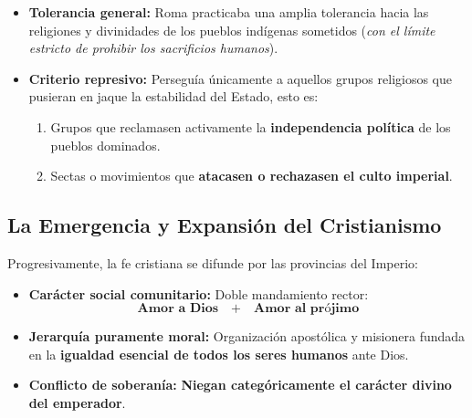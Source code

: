 \documentclass[11pt,letterpaper]{article}
\begin{document}
\begin{notabox}[title={Política Romana ante los Cultos Exteriores}]
  \begin{itemize}
    \item \textbf{Tolerancia general:} Roma practicaba una amplia tolerancia hacia las religiones y divinidades de los pueblos indígenas sometidos (\textit{con el límite estricto de prohibir los sacrificios humanos}).
    \item \textbf{Criterio represivo:} Perseguía únicamente a aquellos grupos religiosos que pusieran en jaque la estabilidad del Estado, esto es:
    \begin{enumerate}
      \item Grupos que reclamasen activamente la \textbf{independencia política} de los pueblos dominados.
      \item Sectas o movimientos que \textbf{atacasen o rechazasen el culto imperial}.
    \end{enumerate}
  \end{itemize}
\end{notabox}

\subsection{La Emergencia y Expansión del Cristianismo}
Progresivamente, la fe cristiana se difunde por las provincias del Imperio:

\begin{conceptbox}[title={Rasgos Fundamentales del Cristianismo Primitivo}]
  \begin{itemize}
    \item \textbf{Carácter social comunitario:} Doble mandamiento rector:
    \[
      \textbf{Amor a Dios} \quad+\quad \textbf{Amor al prójimo}
    \]
    \item \textbf{Jerarquía puramente moral:} Organización apostólica y misionera fundada en la \textbf{igualdad esencial de todos los seres humanos} ante Dios.
    \item \textbf{Conflicto de soberanía:} \textbf{Niegan categóricamente el carácter divino del emperador}.
  \end{itemize}
\end{conceptbox}
\end{document}
